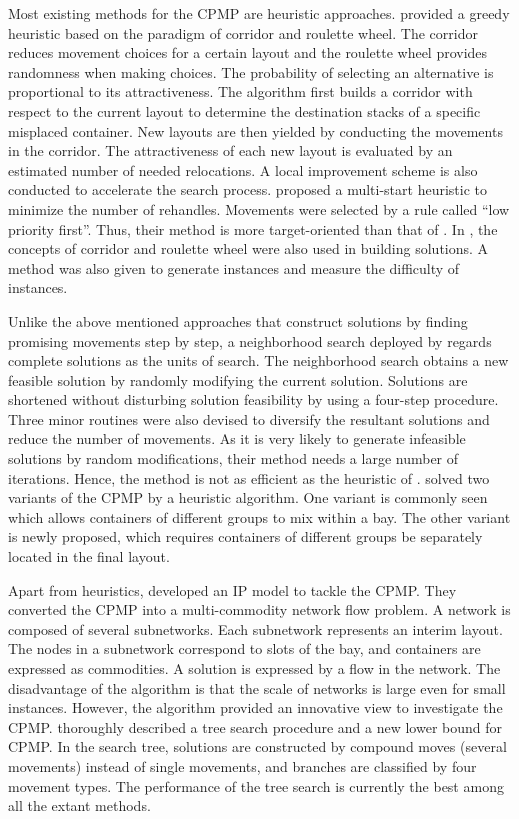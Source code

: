 \documentclass[review,3p,times,authoryear,12pt]{elsarticle}
\begin{document}
Most existing methods for the CPMP are heuristic approaches. 
\cite{Caserta2009} provided a greedy heuristic based on the paradigm of corridor and roulette wheel. 
The corridor reduces movement choices for a certain layout and the roulette wheel provides randomness when making choices. 
The probability of selecting an alternative is proportional to its attractiveness.
The algorithm first builds a corridor with respect to the current layout to determine the destination stacks of a specific misplaced container. 
New layouts are then yielded by conducting the movements in the corridor. 
The attractiveness of each new layout is evaluated by an estimated number of needed relocations. 
A local improvement scheme is also conducted to accelerate the search process.
\cite{Exposito2012} proposed a multi-start heuristic to minimize the number of rehandles. 
Movements were selected by a rule called ``low priority first''. 
Thus, their method is more target-oriented than that of \cite{Caserta2009}. 
In \cite{Exposito2012}, the concepts of corridor and roulette wheel were also used in building solutions. 
A method was also given to generate instances and measure the difficulty of instances.

Unlike the above mentioned approaches that construct solutions by finding promising movements step by step, a neighborhood search deployed by \cite{Lee2009} regards complete solutions as the units of search. 
The neighborhood search obtains a new feasible solution by randomly modifying the current solution.
Solutions are shortened without disturbing solution feasibility by using a four-step procedure. 
Three minor routines were also devised to diversify the resultant solutions and reduce the number of movements. 
As it is very likely to generate infeasible solutions by random modifications, their method needs a large number of iterations. 
Hence, the method is not as efficient as the heuristic of \cite{Exposito2012}.
\cite{Huang2012heu} solved two variants of the CPMP by a heuristic algorithm. 
One variant is commonly seen which allows containers of different groups to mix within a bay. 
The other variant is newly proposed, which requires containers of different groups be separately located in the final layout.

Apart from heuristics, \cite{Lee2007} developed an IP model to tackle the CPMP. 
They converted the CPMP into a multi-commodity network flow problem. 
A network is composed of several subnetworks. 
Each subnetwork represents an interim layout.
The nodes in a subnetwork correspond to slots of the bay, and containers are expressed as commodities. 
A solution is expressed by a flow in the network. 
The disadvantage of the algorithm is that the scale of networks is large even for small instances.
However, the algorithm provided an innovative view to investigate the CPMP.
\cite{BF2012} thoroughly described a tree search procedure and a new lower bound for CPMP. 
In the search tree, solutions are constructed by compound moves (several movements) instead of single movements, and branches are classified by four movement types. 
The performance of the tree search is currently the best among all the extant methods.
\end{document}
